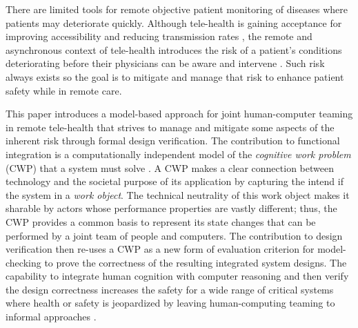 There are limited tools for remote objective patient monitoring of diseases where patients may deteriorate quickly. Although tele-health is gaining acceptance for improving accessibility and reducing transmission rates \cite{10.1093/jamia/ocaa048,telehealth,10.1093/jamia/ocaa067}, the remote and asynchronous context of tele-health introduces the risk of a patient's conditions deteriorating before their physicians can be aware and intervene \cite{10.1097/ALN.0000000000003578}. Such risk always exists so the goal is to mitigate and manage that risk to enhance patient safety while in remote care. 

\begin{comment}
  Remote patient monitoring relies on clinicians, health IT, patients-caregivers, and other concurrent actors to each reliably perform various asynchronous tasks to coordinate patient care and safety \cite{remote,Aalam229}. Designing such systems becomes complex quickly because actors are outside the direct control of the system. These distributed and asynchronous characteristics make manual reasoning about functional integration and safety early in the design process very difficult; and yet, early in the design process is exactly the time to clearly establish the utility of the design in fulfilling its intended purpose. 
\end{comment}

This paper introduces a model-based approach for joint human-computer teaming in remote tele-health 
that strives to manage and mitigate some aspects of the inherent risk through formal design verification. The contribution to functional integration is a computationally independent model of the \emph{cognitive work problem} (CWP) that a system must solve \cite{workflowmodel,workcentered,BERRY201615,chi2010}. A CWP makes a clear connection between technology and the societal purpose of its application by capturing the intend if the system in a \emph{work object}. The technical neutrality of this work object makes it sharable by actors whose performance properties are vastly different; thus, the CWP provides a common basis to represent its state changes that can be performed by a joint team of people and computers. The contribution to design verification then re-uses a CWP as a new form of evaluation criterion for model-checking to prove the correctness of the resulting integrated system designs. The capability to integrate human cognition with computer reasoning and then verify the design correctness increases the safety for a wide range of critical systems where health or safety is jeopardized by leaving human-computing teaming to informal approaches \cite{remote,Aalam229}.

